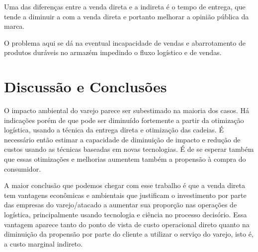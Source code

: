 \documentclass[]{article}
\begin{document}
	Uma das diferenças entre a venda direta e a indireta é o tempo de entrega, que tende a diminuir a com a venda direta e portanto melhorar a opinião pública da marca. 
	
	
	
	
	O problema aqui se dá na eventual incapacidade de vendas e abarrotamento de produtos duráveis no armazém impedindo o fluxo logístico e de vendas.
	
	
	
	
	\section{Discussão e Conclusões}
	
	O impacto ambiental do varejo parece ser subestimado na maioria dos casos. Há indicações porém de que pode ser diminuído fortemente a partir da otimização logística, usando a técnica da entrega direta e otimização das cadeias. É necessário então estimar a capacidade de diminuição de impacto e redução de custos usando as técnicas baseadas em novas tecnologias. É de se esperar também que essas otimizações e melhorias aumentem também a propensão à compra do consumidor.
	
	A maior conclusão que podemos chegar com esse trabalho é que a venda direta tem vantagens econômicas e ambientais que justificam o investimento por parte das empresas do varejo/atacado a aumentar sua proporção nas operações de logística, principalmente usando tecnologia e ciência no processo decisório. Essa vantagem aparece tanto do ponto de vista de custo operacional direto quanto na diminuição da propensão por parte do cliente a utilizar o serviço do varejo, isto é, a custo marginal indireto.
	
	
	
	
	
	
\end{document}
